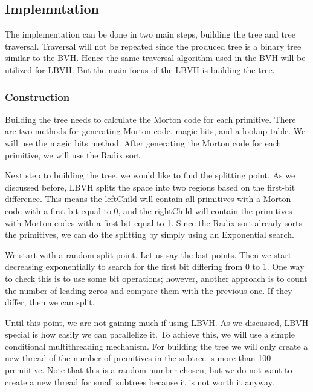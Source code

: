 \documentclass[11pt,a4paper]{article}
\begin{document}
\subsection{Implemntation}
The implementation can be done in two main steps, building the tree and tree traversal. Traversal will not be repeated since the produced tree is a binary tree similar to the BVH. Hence the same traversal algorithm used in the BVH will be utilized for LBVH. But the main focus of the LBVH is building the tree.


\subsubsection{Construction}
 Building the tree needs to calculate the Morton code for each primitive. There are two methods for generating Morton code, magic bits, and a lookup table. We will use the magic bits method. After generating the Morton code for each primitive, we will use the Radix sort.
\\
\noindent

Next step to building the tree, we would like to find the splitting point. As we discussed before, LBVH splits the space into two regions based on the first-bit difference. This means the leftChild will contain all primitives with a Morton code with a first bit equal to 0, and the rightChild will contain the primitives with Morton codes with a first bit equal to 1. Since the Radix sort already sorts the primitives, we can do the splitting by simply using an Exponential search. 
\\
\noindent

We start with a random split point. Let us say the last points. Then we start decreasing exponentially to search for the first bit differing from 0 to 1. One way to check this is to use some bit operations; however, another approach is to count the number of leading zeros and compare them with the previous one. If they differ, then we can split. 
\\
\noindent

Until this point, we are not gaining much if using LBVH. As we discussed, LBVH special is how easily we can parallelize it. To achieve this, we will use a simple conditional multithreading mechanism. For building the tree we will only create a new thread of the number of premitives in the subtree is more than 100 premiitive. Note that this is a random number chosen, but we do not want to create a new thread for small subtrees because it is not worth it anyway.
\end{document}
